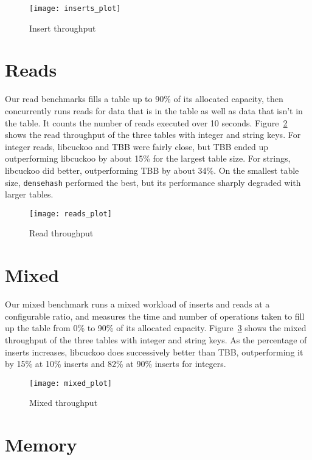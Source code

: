 \documentclass[12pt, letterpaper]{article}
\newcommand{\myfigwidth}{0.9\textwidth}
\newcommand{\densehash}{\texttt{dense\textunderscore hash}}
\begin{document}
\begin{figure}
  \centering
  \texttt{[image: inserts\_plot]}
  \caption{Insert throughput}
  \label{fig:inserts}
\end{figure}

\section{Reads}
\label{sec:reads}

Our read benchmarks fills a table up to 90\% of its allocated capacity, then
concurrently runs reads for data that is in the table as well as data that isn't
in the table. It counts the number of reads executed over 10 seconds.
Figure~\ref{fig:reads} shows the read throughput of the three tables with
integer and string keys. For integer reads, libcuckoo and TBB were fairly close,
but TBB ended up outperforming libcuckoo by about 15\% for the largest table
size. For strings, libcuckoo did better, outperforming TBB by about 34\%. On the
smallest table size, {\densehash} performed the best, but its performance
sharply degraded with larger tables.

\begin{figure}
  \centering
  \texttt{[image: reads\_plot]}
  \caption{Read throughput}
  \label{fig:reads}
\end{figure}

\section{Mixed}
\label{sec:mixed}

Our mixed benchmark runs a mixed workload of inserts and reads at a configurable
ratio, and measures the time and number of operations taken to fill up the table
from 0\% to 90\% of its allocated capacity. Figure~\ref{fig:mixed} shows the
mixed throughput of the three tables with integer and string keys. As the
percentage of inserts increases, libcuckoo does successively better than TBB,
outperforming it by 15\% at 10\% inserts and 82\% at 90\% inserts for integers.

\begin{figure}
  \centering
  \texttt{[image: mixed\_plot]}
  \caption{Mixed throughput}
  \label{fig:mixed}
\end{figure}

\section{Memory}
\label{sec:memory}
\end{document}
